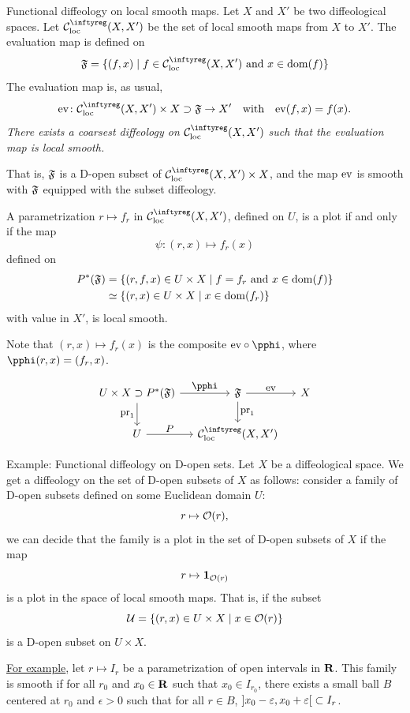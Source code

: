 \begin{Article}{Functional diffeology on local smooth maps.}{}
  Let $X$ and $X'$ be two diffeological spaces.
  Let $\Cinfty_\loc(X,X')$ be the set of local smooth maps from $X$ to $X'$.
  The evaluation map is defined on
  $$%
    \fF = \{ (f,x) \mid f \in \Cinfty_\loc(X,X') \text{ and } x \in \Domain(f) \}
  $$%
  The evaluation map is,
  as usual,
  $$%
    \Eval \colon \Cinfty_\loc(X,X') \times X \supset \fF \to X' \quad \text{with} \quad \Eval(f,x) = f(x).
  $$%
   {\itshape There exists a coarsest diffeology on $\Cinfty_\loc(X,X')$ such that the evaluation map is local smooth.}

  That is,
  ${\mathfrak F}$ is a D-open subset of $\Cinfty_\loc(X,X') \times X$,
  and the map ${\operatorname{ev}}$ is smooth with ${\mathfrak F}$ equipped with the subset diffeology.

  A parametrization $r \mapsto f_r$ in $\Cinfty_\loc(X,X')$,
  defined on $U$,
  is a plot if and only if the map
  $$%
    \psi \colon (r,x) \mapsto f_r(x)
  $$%
  defined on
  \begin{align*}
    P^*({\mathfrak F}) & =  \{ (r,f, x) \in U \times X \mid f = f_r \text{ and } x \in \mathrm{dom}(f)\} \\
    & \simeq \{ (r,x) \in U \times X \mid x \in \mathrm{dom}(f_r)\}
  \end{align*}
  with value in $X'$,
  is local smooth.

  Note that $(r,x) \mapsto f_r(x)$ is the composite $\Eval \circ \pphi$,
  where $\pphi(r,x) = (f_r,x)$.

  $$%
    \begin{tikzcd}[column sep=small,every label/.append style = {font = \small}]
    U \times X \supset P^*(\fF) \arrow[d, swap, "\Proj_1"]  \arrow[r, "\pphi"] & \fF \arrow[r, "\Eval"] \arrow[d, "\Proj_1"] & X \\
    U  \arrow[r, "P"] & \Cinfty_\loc(X,X')  &
    \end{tikzcd}
  $$%
\end{Article}

\begin{Article}{Example: Functional diffeology on D-open sets.}{}
  Let $X$ be a diffeological space.
  We get a diffeology on the set of D-open subsets of $X$ as follows:
  consider a family of D-open subsets defined on some Euclidean domain $U$:
  $$%
    r \mapsto \cO(r),
  $$%
  we can decide that the family is a plot in the set of D-open subsets of $X$ if the map
  $$%
    r \mapsto   \Id_{\cO(r)}
  $$%
  is a plot in the space of local smooth maps.
  That is,
  if the subset
  $$%
    \cU = \{(r,x) \in U \times X \mid x \in \cO(r) \}
  $$%
  is a D-open subset on $U \times X$.

  \uline{For example},
  let $r \mapsto I_r$ be a parametrization of open intervals in $\mathbf{R}$.
  This family is smooth if for all $r_0$ and $x_0 \in \mathbf{R}$ such that $x_0 \in I_{r_0}$,
  there exists a small ball $B$ centered at $r_0$ and $\epsilon > 0$ such that for all $r \in B$,
  $\mathopen] x_0 - \varepsilon, x_0 + \varepsilon \mathclose[ \subset I_r$.
\end{Article}

